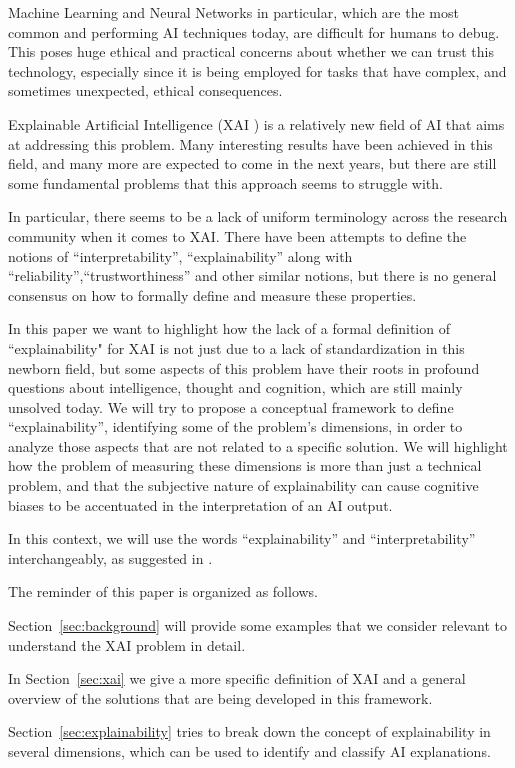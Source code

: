 \documentclass[conference]{IEEEtran}
\newcommand{\cit}[1][]{\todo[tickmarkheight=0.2cm]{cit #1}}
\begin{document}
Machine Learning and Neural Networks in particular, which are the most common
and performing AI techniques today, are difficult for humans to debug.
This poses huge ethical and practical concerns about whether we can trust this technology, especially since it is being employed for tasks that have complex, and sometimes unexpected, ethical consequences. \cit

Explainable Artificial Intelligence (XAI \cit) is a relatively new field of AI
that aims at addressing this problem. Many interesting results have been
achieved in this field, and many more are expected to come in the next years, but there
are still some fundamental problems that this approach seems to struggle with.

In particular, there seems to be a lack of uniform terminology across the
research community when it comes to XAI. There have been attempts to define the
notions of ``interpretability'', ``explainability'' along with
``reliability'',``trustworthiness'' and other similar notions, but there is no
general consensus on how to formally define and measure these properties.
\cit

In this paper we want to highlight how the lack of a formal definition of ``explainability" for XAI is not just due to a lack of standardization in this newborn field, but some aspects of this problem have their roots in profound questions about intelligence, thought and cognition, which are still mainly unsolved today. We will try to propose a conceptual framework to define ``explainability'', identifying some of the problem's dimensions, in order to analyze those aspects that are not related to a specific solution. We will highlight how the problem of measuring these dimensions is more than just a technical problem, and that the subjective nature of explainability can cause cognitive biases to be accentuated in the interpretation of an AI output.

In this context, we will use  the words “explainability” and “interpretability”
interchangeably, as suggested in \cit.

The reminder of this paper is organized as follows.

Section~\ref{sec:background} will provide  some examples that we consider relevant to understand
the XAI problem in detail.

In Section~\ref{sec:xai} we give a more specific definition of XAI and a general
overview of the solutions that are being developed in this framework.

Section~\ref{sec:explainability} tries to break down the concept of explainability in several dimensions, which can be used to identify and classify AI explanations.
\end{document}
